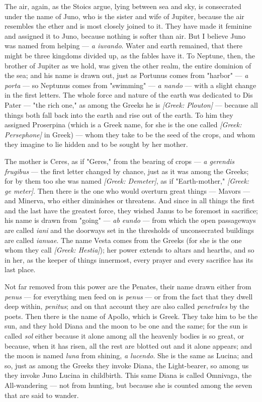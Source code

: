  The air, again, as the Stoics argue, lying between sea and sky, is consecrated under the name of Juno, who is the sister and wife of Jupiter, because the air resembles the ether and is most closely joined to it. They have made it feminine and assigned it to Juno, because nothing is softer than air. But I believe Juno was named from helping --- \textit{a iuvando}. Water and earth remained, that there might be three kingdoms divided up, as the fables have it. To Neptune, then, the brother of Jupiter as we hold, was given the other realm, the entire dominion of the sea; and his name is drawn out, just as Portunus comes from "harbor" --- \textit{a porta} --- so Neptunus comes from "swimming" --- \textit{a nando} --- with a slight change in the first letters. The whole force and nature of the earth was dedicated to Dis Pater --- "the rich one," as among the Greeks he is \textit{[Greek: Plouton]} --- because all things both fall back into the earth and rise out of the earth. To him they assigned Proserpina (which is a Greek name, for she is the one called \textit{[Greek: Persephone]} in Greek) --- whom they take to be the seed of the crops, and whom they imagine to lie hidden and to be sought by her mother.

 The mother is Ceres, as if "Geres," from the bearing of crops --- \textit{a gerendis frugibus} --- the first letter changed by chance, just as it was among the Greeks; for by them too she was named \textit{[Greek: Demeter]}, as if "Earth-mother," \textit{[Greek: ge meter]}. Then there is the one who would overturn great things --- Mavors --- and Minerva, who either diminishes or threatens. And since in all things the first and the last have the greatest force, they wished Janus to be foremost in sacrifice; his name is drawn from "going" --- \textit{ab eundo} --- from which the open passageways are called \textit{iani} and the doorways set in the thresholds of unconsecrated buildings are called \textit{ianuae}. The name Vesta comes from the Greeks (for she is the one whom they call \textit{[Greek: Hestia]}); her power extends to altars and hearths, and so in her, as the keeper of things innermost, every prayer and every sacrifice has its last place.

 Not far removed from this power are the Penates, their name drawn either from \textit{penus} --- for everything men feed on is \textit{penus} --- or from the fact that they dwell deep within, \textit{penitus}; and on that account they are also called \textit{penetrales} by the poets. Then there is the name of Apollo, which is Greek. They take him to be the sun, and they hold Diana and the moon to be one and the same; for the sun is called \textit{sol} either because it alone among all the heavenly bodies is so great, or because, when it has risen, all the rest are blotted out and it alone appears; and the moon is named \textit{luna} from shining, \textit{a lucendo}. She is the same as Lucina; and so, just as among the Greeks they invoke Diana, the Light-bearer, so among us they invoke Juno Lucina in childbirth. This same Diana is called Omnivaga, the All-wandering --- not from hunting, but because she is counted among the seven that are said to wander.

